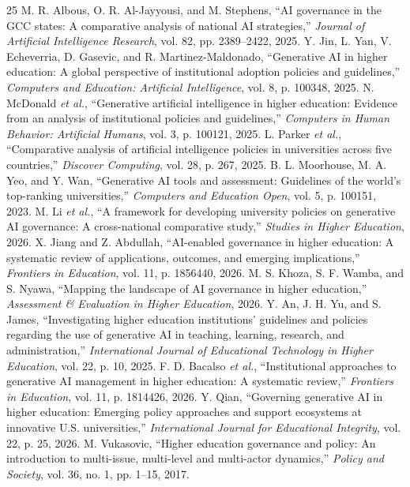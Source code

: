 \documentclass[conference,letterpaper]{IEEEtran}
\begin{document}
\begin{thebibliography}{25}\footnotesize
{} M. R. Albous, O. R. Al-Jayyousi, and M. Stephens, ``AI governance in the GCC states: A comparative analysis of national AI strategies,'' \emph{Journal of Artificial Intelligence Research}, vol. 82, pp. 2389--2422, 2025.
 Y. Jin, L. Yan, V. Echeverria, D. Gasevic, and R. Martinez-Maldonado, ``Generative AI in higher education: A global perspective of institutional adoption policies and guidelines,'' \emph{Computers and Education: Artificial Intelligence}, vol. 8, p. 100348, 2025.
 N. McDonald \emph{et al.}, ``Generative artificial intelligence in higher education: Evidence from an analysis of institutional policies and guidelines,'' \emph{Computers in Human Behavior: Artificial Humans}, vol. 3, p. 100121, 2025.
 L. Parker \emph{et al.}, ``Comparative analysis of artificial intelligence policies in universities across five countries,'' \emph{Discover Computing}, vol. 28, p. 267, 2025.
 B. L. Moorhouse, M. A. Yeo, and Y. Wan, ``Generative AI tools and assessment: Guidelines of the world's top-ranking universities,'' \emph{Computers and Education Open}, vol. 5, p. 100151, 2023.
 M. Li \emph{et al.}, ``A framework for developing university policies on generative AI governance: A cross-national comparative study,'' \emph{Studies in Higher Education}, 2026.
 X. Jiang and Z. Abdullah, ``AI-enabled governance in higher education: A systematic review of applications, outcomes, and emerging implications,'' \emph{Frontiers in Education}, vol. 11, p. 1856440, 2026.
 M. S. Khoza, S. F. Wamba, and S. Nyawa, ``Mapping the landscape of AI governance in higher education,'' \emph{Assessment \& Evaluation in Higher Education}, 2026.
 Y. An, J. H. Yu, and S. James, ``Investigating higher education institutions' guidelines and policies regarding the use of generative AI in teaching, learning, research, and administration,'' \emph{International Journal of Educational Technology in Higher Education}, vol. 22, p. 10, 2025.
 F. D. Bacalso \emph{et al.}, ``Institutional approaches to generative AI management in higher education: A systematic review,'' \emph{Frontiers in Education}, vol. 11, p. 1814426, 2026.
 Y. Qian, ``Governing generative AI in higher education: Emerging policy approaches and support ecosystems at innovative U.S. universities,'' \emph{International Journal for Educational Integrity}, vol. 22, p. 25, 2026.
 M. Vukasovic, ``Higher education governance and policy: An introduction to multi-issue, multi-level and multi-actor dynamics,'' \emph{Policy and Society}, vol. 36, no. 1, pp. 1--15, 2017.

\end{thebibliography}
\end{document}
